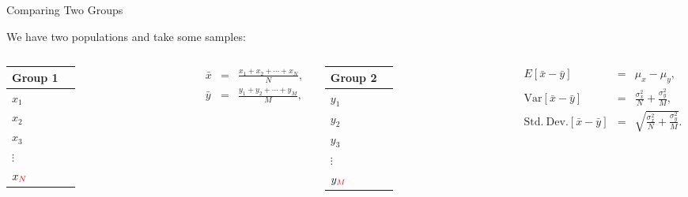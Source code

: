 \begin{frame}{Comparing Two Groups}

  We have two populations and take some samples: \\
  \begin{columns}
    \begin{tabular}{ll}
      Group 1 \\ \hline
      $x_1$  \\
      $x_2$  \\
      $x_3$  \\
      $\vdots$ \\
      $x_{{\color{red}N}}$  \\
    \end{tabular}

    \begin{eqnarray*}
      \bar{x} & = & \frac{x_1+x_2+\cdots+x_N}{N}, \\
      \bar{y} & = & \frac{y_1+y_2+\cdots+y_M}{M}, \\
    \end{eqnarray*}

    \begin{tabular}{ll}
      Group 2 \\ \hline
      $y_1$ \\
      $y_2$ \\
      $y_3$ \\
      $\vdots$ \\
      $y_{{\color{red}M}}$ \\
    \end{tabular}

    \begin{eqnarray*}
      E[\bar{x}-\bar{y}] & = & \mu_x - \mu_y, \\
      \mathrm{Var}[\bar{x}-\bar{y}] & = & \frac{\sigma^2_x}{N} + \frac{\sigma^2_y}{M}, \\
      \mathrm{Std.~Dev.}[\bar{x}-\bar{y}] & = & \sqrt{\frac{\sigma^2_x}{N} + \frac{\sigma^2_y}{M}}.
    \end{eqnarray*}

  \end{columns}

  \vfill


  \vfill

\end{frame}


